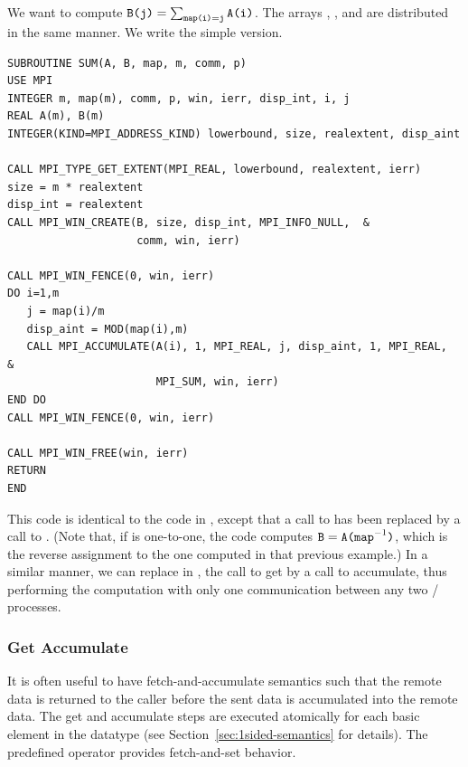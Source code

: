 \begin{example}
\label{ex:1sided-sum}
%
We want to compute $\texttt{B(j)} = \sum_{\texttt{\scriptsize{}map(i)} = \texttt{\scriptsize{}j}} \texttt{A(i)}$.
The arrays
, , and  are
distributed in the same manner.  We write
the simple version.

\begin{lstlisting}[language={[MPI]Fortran}]
SUBROUTINE SUM(A, B, map, m, comm, p)
USE MPI
INTEGER m, map(m), comm, p, win, ierr, disp_int, i, j
REAL A(m), B(m)
INTEGER(KIND=MPI_ADDRESS_KIND) lowerbound, size, realextent, disp_aint

CALL MPI_TYPE_GET_EXTENT(MPI_REAL, lowerbound, realextent, ierr)
size = m * realextent
disp_int = realextent
CALL MPI_WIN_CREATE(B, size, disp_int, MPI_INFO_NULL,  &
                    comm, win, ierr)

CALL MPI_WIN_FENCE(0, win, ierr)
DO i=1,m
   j = map(i)/m
   disp_aint = MOD(map(i),m)
   CALL MPI_ACCUMULATE(A(i), 1, MPI_REAL, j, disp_aint, 1, MPI_REAL,   &
                       MPI_SUM, win, ierr)
END DO
CALL MPI_WIN_FENCE(0, win, ierr)

CALL MPI_WIN_FREE(win, ierr)
RETURN
END
\end{lstlisting}

This code is identical to the code in
,
except that a call to  has been
replaced by a call to .  (Note that, if  is
one-to-one, the code computes $\texttt{B} =
\texttt{A(map}^{-1}\texttt{)}$, which is the 
reverse assignment to the one computed in that previous example.)
In a similar manner, we can replace
in ,
the call to get by a call to accumulate,
thus
performing the computation with only one communication between any
two \mpi/ processes.
\end{example}

\subsubsection{Get Accumulate}
\label{sec:1sided-getaccumulate}

It is often useful to have fetch-and-accumulate semantics such that
the remote data is returned to the caller before the sent data is
accumulated into the remote data.  The get and accumulate
steps are executed atomically for each basic element in the datatype
(see Section~\ref{sec:1sided-semantics} for details).
The predefined operator  provides fetch-and-set
behavior.


